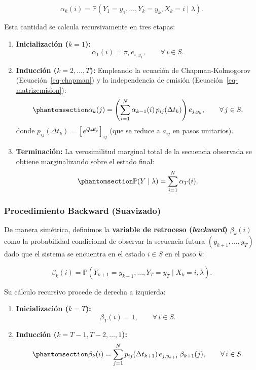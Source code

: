 \documentclass[
  spanish,
  us-letterpaper,
]{scrreprt}
\providecommand{\tightlist}{%
  \setlength{\itemsep}{0pt}\setlength{\parskip}{0pt}}
\theoremstyle{definition}
\theoremstyle{remark}
\begin{document}
\[
\alpha_k(i) = \mathbb{P}(Y_1 = y_1, \dots, Y_k = y_k, X_k = i \mid \lambda).
\]

Esta cantidad se calcula recursivamente en tres etapas:

\begin{enumerate}
\def\labelenumi{\arabic{enumi}.}
\tightlist
\item
  \textbf{Inicialización (\(k = 1\)):} \[
  \alpha_1(i) = \pi_i \, e_{i, y_1}, \qquad \forall\, i \in S.
  \]
\item
  \textbf{Inducción (\(k = 2, \dots, T\)):} Empleando la ecuación de
  Chapman-Kolmogorov (Ecuación~\ref{eq-chapman}) y la independencia de
  emisión (Ecuación~\ref{eq-matrizemision}):
  \begin{equation}\phantomsection\label{eq-forward-recursion}{
  \alpha_k(j) = \left(\sum_{i=1}^{N} \alpha_{k-1}(i)\, p_{ij}(\Delta t_k)\right) e_{j, y_k}, \qquad \forall\, j \in S,
  }\end{equation} donde \(p_{ij}(\Delta t_k) = [e^{Q\Delta t_k}]_{ij}\)
  (que se reduce a \(a_{ij}\) en pasos unitarios).
\item
  \textbf{Terminación:} La verosimilitud marginal total de la secuencia
  observada se obtiene marginalizando sobre el estado final:
  \begin{equation}\phantomsection\label{eq-verosimilitud-total}{
  \mathbb{P}(Y \mid \lambda) = \sum_{i=1}^{N} \alpha_T(i).
  }\end{equation}
\end{enumerate}

\subsubsection{Procedimiento Backward
(Suavizado)}\label{procedimiento-backward-suavizado}

De manera simétrica, definimos la \textbf{variable de retroceso
(\emph{backward})} \(\beta_k(i)\) como la probabilidad condicional de
observar la secuencia futura \((y_{k+1}, \dots, y_T)\) dado que el
sistema se encuentra en el estado \(i \in S\) en el paso \(k\):

\[
\beta_k(i) = \mathbb{P}(Y_{k+1} = y_{k+1}, \dots, Y_T = y_T \mid X_k = i, \lambda).
\]

Su cálculo recursivo procede de derecha a izquierda:

\begin{enumerate}
\def\labelenumi{\arabic{enumi}.}
\tightlist
\item
  \textbf{Inicialización (\(k = T\)):} \[
  \beta_T(i) = 1, \qquad \forall\, i \in S.
  \]
\item
  \textbf{Inducción (\(k = T-1, T-2, \dots, 1\)):}
  \begin{equation}\phantomsection\label{eq-backward-recursion}{
  \beta_k(i) = \sum_{j=1}^{N} p_{ij}(\Delta t_{k+1})\, e_{j, y_{k+1}}\, \beta_{k+1}(j), \qquad \forall\, i \in S.
  }\end{equation}
\end{enumerate}
\end{document}
